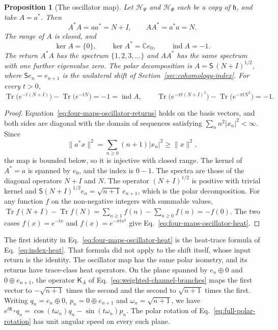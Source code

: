 \documentclass[11pt]{article}
\newtheorem{proposition}{Proposition}[section]
\theoremstyle{definition}
\DeclareMathOperator{\Tr}{Tr}
\newcommand{\C}{\mathbb C}
\begin{document}
\begin{proposition}[The oscillator map]
\label{prop:four-maps-oscillator}
Let $\mathcal H_\Psi$ and $\mathcal H_\Phi$ each be a copy of $\mathfrak h$, and take $A=a^*$. Then
\begin{equation}
 A^*A=aa^*=N+I,\qquad AA^*=a^*a=N .
 \label{eq:four-maps-oscillator-returns}
\end{equation}
The range of $A$ is closed, and
\begin{equation}
 \ker A=\{0\},\qquad\ker A^*=\C e_0,\qquad\operatorname{ind}A=-1 .
 \label{eq:four-maps-oscillator-index}
\end{equation}
The return $A^*A$ has the spectrum $\{1,2,3,\dots\}$ and $AA^*$ has the same spectrum with one further eigenvalue zero. The polar decomposition is $A=\mathsf S\,(N+I)^{1/2}$, where $\mathsf S e_n=e_{n+1}$ is the unilateral shift of Section~\ref{sec:cohomology-index}. For every $t>0$,
\begin{equation}
 \Tr\bigl(e^{-t(N+I)}\bigr)-\Tr\bigl(e^{-tN}\bigr)=-1=\operatorname{ind}A ,\qquad
 \Tr\bigl(e^{-\pi t(N+I)^2}\bigr)-\Tr\bigl(e^{-\pi tN^2}\bigr)=-1 .
 \label{eq:four-maps-oscillator-heat}
\end{equation}
\end{proposition}
\begin{proof}
Equation~\eqref{eq:four-maps-oscillator-returns} holds on the basis vectors, and both sides are diagonal with the domain of sequences satisfying $\sum_nn^2|x_n|^2<\infty$. Since
\[
 \|a^*x\|^2=\sum_{n\ge0}(n+1)|x_n|^2\ge\|x\|^2 ,
\]
the map is bounded below, so it is injective with closed range. The kernel of $A^*=a$ is spanned by $e_0$, and the index is $0-1$. The spectra are those of the diagonal operators $N+I$ and $N$. The operator $(N+I)^{1/2}$ is positive with trivial kernel and $\mathsf S(N+I)^{1/2}e_n=\sqrt{n+1}\,e_{n+1}$, which is the polar decomposition. For any function $f$ on the non-negative integers with summable values, $\Tr f(N+I)-\Tr f(N)=\sum_{n\ge1}f(n)-\sum_{n\ge0}f(n)=-f(0)$. The two cases $f(x)=e^{-tx}$ and $f(x)=e^{-\pi tx^2}$ give Eq.~\eqref{eq:four-maps-oscillator-heat}.
\end{proof}

The first identity in Eq.~\eqref{eq:four-maps-oscillator-heat} is the heat-trace formula of Eq.~\eqref{eq:index-heat}. That formula did not apply to the shift itself, whose input return is the identity. The oscillator map has the same polar isometry, and its returns have trace-class heat operators. On the plane spanned by $e_n\oplus0$ and $0\oplus e_{n+1}$, the operator $\mathsf K_A$ of Eq.~\eqref{eq:weighted-channel-branches} maps the first vector to $-\sqrt{n+1}$ times the second and the second to $\sqrt{n+1}$ times the first. Writing $q_n=e_n\oplus0$, $p_n=0\oplus e_{n+1}$ and $\omega_n=\sqrt{n+1}$, we have $e^{t\mathsf K_A}q_n=\cos(t\omega_n)q_n-\sin(t\omega_n)p_n$. The polar rotation of Eq.~\eqref{eq:full-polar-rotation} has unit angular speed on every such plane.
\end{document}
